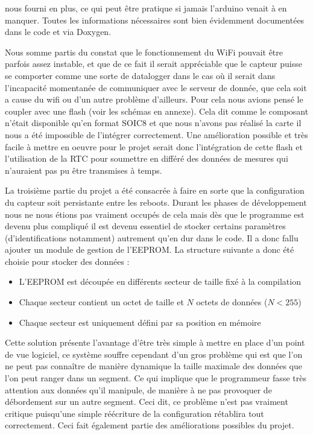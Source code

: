 		nous fourni en plus, ce qui peut être pratique si jamais l'arduino venait à en manquer. Toutes
		les informations nécessaires sont bien évidemment documentées dans le code et via Doxygen.
		\par
		Nous somme partis du constat que le fonctionnement du WiFi pouvait être parfois
		assez instable, et que de ce fait il serait appréciable que le capteur puisse se comporter
		comme une sorte de datalogger dans le cas où il serait dans l'incapacité momentanée de communiquer
		avec le serveur de donnée, que cela soit a cause du wifi ou d'un autre problème d'ailleurs.
		Pour cela nous avions pensé le coupler avec une flash (voir les schémas en annexe). Cela dit
		comme le composant n'était disponible qu'en format SOIC8 et que nous n'avons pas réalisé la carte
		il nous a été impossible de l'intégrer correctement. Une amélioration possible et très facile à
		mettre en oeuvre pour le projet serait donc l'intégration de cette flash et l'utilisation
		de la RTC pour soumettre en différé des données de mesures qui n'auraient pas pu être
		transmises à temps.
		\par
		La troisième partie du projet a été consacrée à faire en sorte que la configuration du capteur
		soit persistante entre les reboots. Durant les phases de développement nous ne nous étions pas
		vraiment occupés de cela mais dès que le programme est devenu plus compliqué il est devenu
		essentiel de stocker certains paramètres (d'identifications notamment) autrement qu'en dur
		dans le code. Il a donc fallu ajouter un module de gestion de l'EEPROM. La structure suivante a donc
		été choisie pour stocker des données :
		\begin{itemize}
			\item L'EEPROM est découpée en différents secteur de taille fixé à la compilation
			\item Chaque secteur contient un octet de taille et $N$ octets de données ($N < 255$)
			\item Chaque secteur est uniquement défini par sa position en mémoire
		\end{itemize}
		
		Cette solution présente l'avantage d'être très simple à mettre en place d'un point de vue
		logiciel, ce système souffre cependant d'un gros problème qui est que l'on ne peut
		pas connaître de manière dynamique la taille maximale des données que l'on peut ranger
		dans un segment. Ce qui implique que le programmeur fasse très attention aux données qu'il
		manipule, de manière à ne pas provoquer de débordement sur un autre segment. Ceci dit,
		ce problème n'est pas vraiment critique puisqu'une simple réécriture de la configuration
		rétablira tout correctement. Ceci fait également partie des améliorations possibles
		du projet.
		
